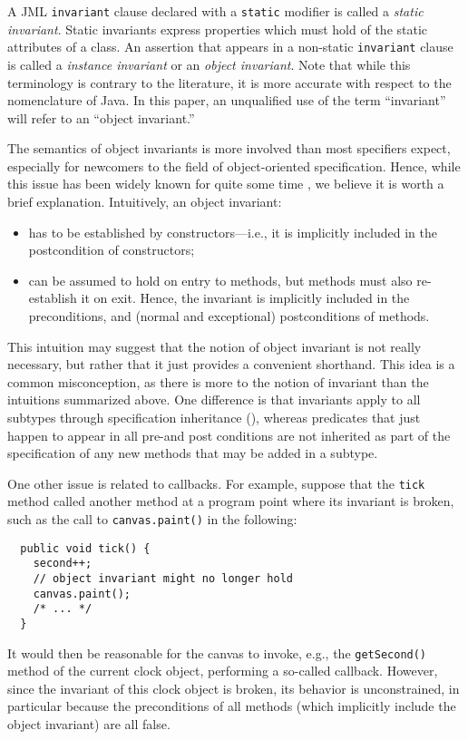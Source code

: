 \documentclass{llncs}
\begin{document}
A JML \texttt{invariant} clause declared with a
\texttt{static} modifier is called a \emph{static invariant}.
%
Static invariants express properties which must hold of the static
attributes of a class.
%
An assertion that appears in a non-static \texttt{invariant} clause is called
a \emph{instance invariant} or an \emph{object invariant}.
%
Note that while this terminology is contrary to the literature, it is more
accurate with respect to the nomenclature of Java.  In this paper, an
unqualified use of the term ``invariant'' will refer to an ``object
invariant.''

The semantics of object invariants is more involved than most specifiers
expect, especially for newcomers to the field of object-oriented specification.
Hence, while this issue has been widely known for quite some time
\cite{Szyperski98}, we believe it is worth a brief explanation.
%
Intuitively, an object invariant:
\begin{itemize}
  \item  has to be established by constructors---i.e., it is implicitly
    included in the postcondition of constructors;
  \item can be assumed to hold on entry to methods, but methods must also
    re-establish it on exit. Hence, the invariant is implicitly included in the
    preconditions, and (normal and exceptional) postconditions of methods.
\end{itemize}

This intuition may suggest that the notion of object invariant is not really
necessary, but rather that it just provides a convenient shorthand.
This idea is a
common misconception, as there is more to the notion of invariant than
the intuitions summarized above. 
One difference is that invariants apply to all subtypes through
specification inheritance (), whereas
predicates that just happen to appear in all pre-and post conditions
are not inherited as part of the specification of any new methods that
may be added in a subtype.

One other issue is related to callbacks.
For example, suppose that the \texttt{tick} method called another method
at a program point where its invariant is broken, such as the call to
\texttt{canvas.paint()} in the following:
\begin{verbatim}
  public void tick() {
    second++;
    // object invariant might no longer hold
    canvas.paint();
    /* ... */
  }
\end{verbatim}
%
It would then be reasonable for the canvas to invoke, e.g., the
\texttt{getSecond()} method of the current clock object, performing a so-called 
callback. 
However, since the invariant of this clock object is broken, its behavior is
unconstrained, in particular because the preconditions of all methods (which
implicitly include the object invariant) are all false.
\end{document}
